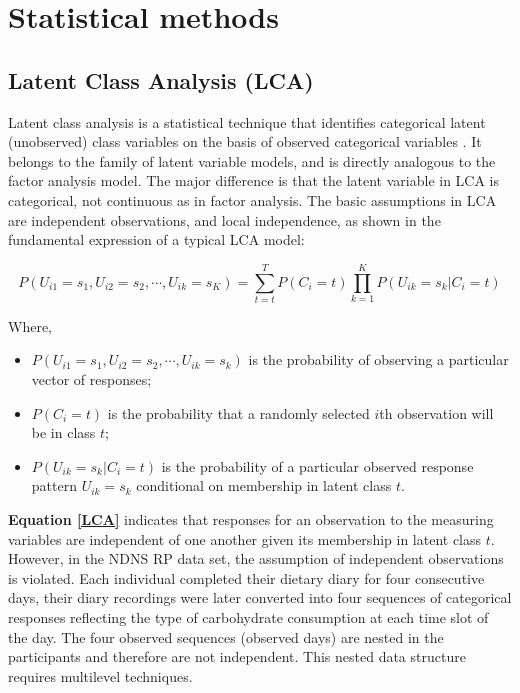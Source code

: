 \section[Statistical methods]{Statistical methods}

\subsection{Latent Class Analysis (LCA)}\vspace{-0.3cm}

Latent class analysis is a statistical technique that identifies categorical latent (unobserved) class variables on the basis of observed categorical variables \parencite{collins2010latent}. It belongs to the family of latent variable models, and is directly analogous to the factor analysis model. The major difference is that the latent variable in LCA is categorical, not continuous as in factor analysis. The basic assumptions in LCA are independent observations, and local independence, as shown in the fundamental expression of a typical LCA model: \vspace{-0.8cm}

\begin{equation}
P(U_{i1} = s_1, U_{i2} = s_2, \cdots, U_{ik} = s_K) = \sum_{t=t}^{T}P(C_i = t)\prod_{k = 1}^{K}P(U_{ik} = s_k | C_i = t)
\label{LCA}
\end{equation}\vspace{-0.7cm}

Where, 

\begin{itemize}
	\item $P(U_{i1} = s_1, U_{i2} = s_2, \cdots, U_{ik} = s_k)$ is the probability of observing a particular vector of responses;
	\item $P(C_i = t)$ is the probability that a randomly selected $i$th observation will be in class $t$;
	\item $P(U_{ik} = s_k | C_i = t)$ is the probability of a particular observed response pattern $U_{ik} = s_k$ conditional on membership in latent class $t$.
\end{itemize}


\textbf{Equation \ref{LCA}} indicates that responses for an observation to the measuring variables are independent of one another given its membership in latent class $t$. However, in the NDNS RP data set, the assumption of independent observations is violated. Each individual completed their dietary diary for four consecutive days, their diary recordings were later converted into four sequences of categorical responses reflecting the type of carbohydrate consumption at each time slot of the day. The four observed sequences (observed days) are nested in the participants and therefore are not independent. This nested data structure requires multilevel techniques. 
\vspace{-0.3cm}

